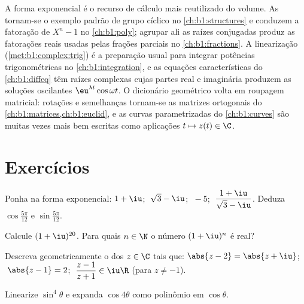 \begin{remark}\label{rem:b1:complex:whereused}
A forma exponencial é o recurso de cálculo mais reutilizado do
volume. As  tornam-se o exemplo padrão de grupo
cíclico no \cref{ch:b1:structures} e conduzem a fatoração
de $X^n - 1$ no \cref{ch:b1:poly}; agrupar ali as raízes conjugadas
produz as fatorações reais usadas pelas frações parciais no
\cref{ch:b1:fractions}. A linearização (\cref{met:b1:complex:trig})
é a preparação usual para integrar potências trigonométricas no
\cref{ch:b1:integration}, e as equações características do
\cref{ch:b1:diffeq} têm raízes complexas cujas partes real e imaginária
produzem as soluções oscilantes $\eu^{\lambda t}\cos\omega
t$. O dicionário
geométrico volta em roupagem matricial: rotações e semelhanças tornam-se
as matrizes ortogonais do \cref{ch:b1:matrices,ch:b1:euclid}, e as curvas parametrizadas do
\cref{ch:b1:curves} são muitas vezes mais bem escritas como aplicações $t \mapsto z(t)
\in \C$.
\end{remark}

\section{Exercícios}

\begin{exercise}[$\star$]\label{exo:b1:complex:1}
Ponha na forma exponencial: $1 + \iu$; $\;\sqrt 3 - \iu$; $\;-5$;
$\;\dfrac{1 + \iu}{\sqrt 3 - \iu}$. Deduza
$\cos\frac{5\pi}{12}$ e $\sin\frac{5\pi}{12}$.
\end{exercise}

\begin{exercise}[$\star$]\label{exo:b1:complex:2}
Calcule $(1 + \iu)^{20}$. Para quais $n \in \N$ o número $(1 + \iu)^n$ é
real?
\end{exercise}

\begin{exercise}[$\star$]\label{exo:b1:complex:3}
Descreva geometricamente o  dos $z \in \C$ tais que:
$\abs{z - 2} = \abs{z + \iu}$; $\;\abs{z - 1} = 2$;
$\;\dfrac{z - 1}{z + 1} \in \iu\R$ (para $z \neq -1$).
\end{exercise}

\begin{exercise}[$\star$]\label{exo:b1:complex:4}
Linearize $\sin^4\theta$ e expanda $\cos 4\theta$ como polinômio em
$\cos\theta$.
\end{exercise}

